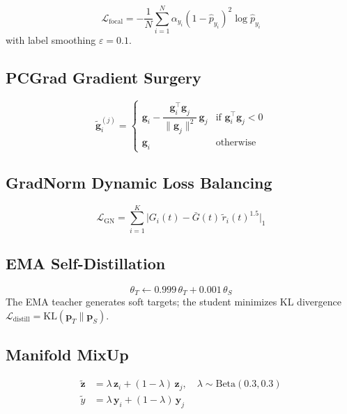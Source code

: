 \documentclass[journal]{IEEEtran}
\newcommand{\Lc}{\mathcal{L}}
\begin{document}
\begin{equation}
\Lc_\text{focal} = -\frac{1}{N}\sum_{i=1}^N
\alpha_{y_i}(1-\hat{p}_{y_i})^2\log\hat{p}_{y_i}
\label{eq:focal}
\end{equation}
with label smoothing $\varepsilon{=}0.1$.

\subsection{PCGrad Gradient Surgery}
\label{sec:pcgrad}

\begin{equation}
\tilde{\mathbf{g}}_i^{(j)} =
\begin{cases}
\mathbf{g}_i - \dfrac{\mathbf{g}_i^\top\mathbf{g}_j}{\|\mathbf{g}_j\|^2}\,\mathbf{g}_j
  & \text{if } \mathbf{g}_i^\top\mathbf{g}_j < 0 \\
\mathbf{g}_i & \text{otherwise}
\end{cases}
\label{eq:pcgrad}
\end{equation}

\subsection{GradNorm Dynamic Loss Balancing}
\label{sec:gradnorm}

\begin{equation}
\Lc_\text{GN} = \sum_{i=1}^{K}\bigl|G_i(t) - \bar{G}(t)\,\tilde{r}_i(t)^{1.5}\bigr|_1
\label{eq:gradnorm}
\end{equation}

\subsection{EMA Self-Distillation}
\label{sec:ema}

\begin{equation}
\theta_T \leftarrow 0.999\,\theta_T + 0.001\,\theta_S
\label{eq:ema}
\end{equation}
The EMA teacher generates soft targets; the student minimizes KL
divergence $\Lc_\text{distill} = \mathrm{KL}(\mathbf{p}_T \| \mathbf{p}_S)$.

\subsection{Manifold MixUp}
\label{sec:mixup}

\begin{align}
\tilde{\mathbf{z}} &= \lambda\,\mathbf{z}_i + (1-\lambda)\,\mathbf{z}_j,\quad
\lambda \sim \mathrm{Beta}(0.3,0.3) \label{eq:mixup}\\
\tilde{y}           &= \lambda\,\mathbf{y}_i + (1-\lambda)\,\mathbf{y}_j \label{eq:mixup_y}
\end{align}
\end{document}
